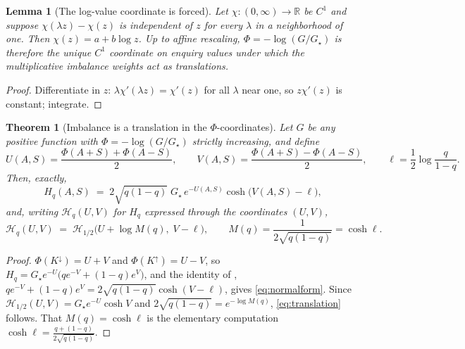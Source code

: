 \documentclass[11pt]{article}
\newtheorem{theorem}{Theorem}
\newtheorem{lemma}{Lemma}
\begin{document}
\begin{lemma}[The log-value coordinate is forced]\label{lem:coordinate}
Let $\chi : (0,\infty) \to \mathbb R$ be $C^1$ and suppose $\chi(\lambda z) - \chi(z)$ is independent of $z$ for every $\lambda$ in a neighborhood of one. Then $\chi(z) = a + b\log z$. Up to affine rescaling, $\Phi = -\log(G/G_\star)$ is therefore the unique $C^1$ coordinate on enquiry values under which the multiplicative imbalance weights act as translations.
\end{lemma}

\begin{proof}
Differentiate in $z$: $\lambda\chi'(\lambda z) = \chi'(z)$ for all $\lambda$ near one, so $z\chi'(z)$ is constant; integrate.
\end{proof}

\begin{theorem}[Imbalance is a translation in the $\Phi$-coordinates]\label{thm:normalform}
Let $G$ be any positive function with $\Phi = -\log(G/G_\star)$ strictly increasing, and define
\[
U(A,S) = \frac{\Phi(A+S)+\Phi(A-S)}{2}, \qquad
V(A,S) = \frac{\Phi(A+S)-\Phi(A-S)}{2}, \qquad
\ell = \frac12\log\frac{q}{1-q}.
\]
Then, exactly,
\begin{equation}
H_q(A,S) \;=\; 2\sqrt{q(1-q)}\;G_\star\, e^{-U(A,S)}\cosh\big(V(A,S)-\ell\big),
\label{eq:normalform}
\end{equation}
and, writing $\mathcal H_q(U,V)$ for $H_q$ expressed through the coordinates $(U,V)$,
\begin{equation}
\mathcal H_q(U,V) \;=\; \mathcal H_{1/2}\big(U + \log M(q),\; V - \ell\big),
\qquad M(q) = \frac{1}{2\sqrt{q(1-q)}} = \cosh\ell .
\label{eq:translation}
\end{equation}
\end{theorem}

\begin{proof}
$\Phi(K^{\downarrow}) = U + V$ and $\Phi(K^{\uparrow}) = U - V$, so
$H_q = G_\star e^{-U}\big(q e^{-V} + (1-q)e^{V}\big)$, and the identity of \citet{cotton2026skew},
$q e^{-V} + (1-q) e^{V} = 2\sqrt{q(1-q)}\cosh(V - \ell)$, gives \eqref{eq:normalform}. Since $\mathcal H_{1/2}(U,V) = G_\star e^{-U}\cosh V$ and $2\sqrt{q(1-q)} = e^{-\log M(q)}$, \eqref{eq:translation} follows. That $M(q) = \cosh\ell$ is the elementary computation $\cosh\ell = \tfrac{q+(1-q)}{2\sqrt{q(1-q)}}$.
\end{proof}
\end{document}
